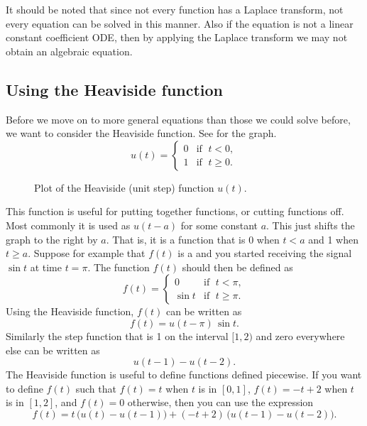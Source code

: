 \documentclass[12pt]{book}
\begin{document}
It should be noted that since not every function has a Laplace transform,
not every equation can be solved in this manner.  Also if the equation
is not a linear constant coefficient ODE,
then by applying the Laplace transform we may not
obtain an algebraic equation.

\subsection{Using the Heaviside function}

Before we move on to more general equations
than those we could solve before,
we want to consider the Heaviside function.  See 
for the graph.
\begin{equation*}
u(t) =
\begin{cases}
0 & \text{if } \; t < 0 , \\ 
1 & \text{if } \; t \geq 0 .
\end{cases}
\end{equation*}

\begin{figure}[h!t]
\capstart
\begin{center}
\caption{Plot of the Heaviside (unit step) function
$u(t)$.\label{lt:heavisidefig}}
\end{center}
\end{figure}

This function is useful for
putting together functions, or cutting functions off.  Most commonly it is
used as $u(t-a)$ for some constant $a$.  This just shifts the graph to the
right by $a$.  That is, it is a function that is 0 when $t < a$ and 1
when $t \geq a$.  Suppose for example that $f(t)$ is a  and
you started receiving the signal
$\sin t$ at time $t=\pi$.  The function $f(t)$ should then be defined as
\begin{equation*}
f(t) =
\begin{cases}
0 & \text{if } \; t < \pi , \\ 
\sin t & \text{if } \; t \geq \pi .
\end{cases}
\end{equation*}
Using the Heaviside function, $f(t)$ can
be written as
\begin{equation*}
f(t) = u(t - \pi) \, \sin t .
\end{equation*}
Similarly the step function that is 1 on the interval $[1,2)$ and zero
everywhere else can be written as
\begin{equation*}
u(t - 1) - u(t-2) .
\end{equation*}
The Heaviside function is useful to define functions defined piecewise.  If
you want to define $f(t)$ such that $f(t) = t$ when $t$ is in $[0,1]$,
$f(t) = -t+2$
when $t$ is in $[1,2]$, and $f(t) = 0$ otherwise, then you can use the expression
\begin{equation*}
f(t) = t \, \bigl( u(t) - u(t-1) \bigr) + 
(-t+2) \, \bigl( u(t - 1) - u(t-2) \bigr) .
\end{equation*}
\end{document}
